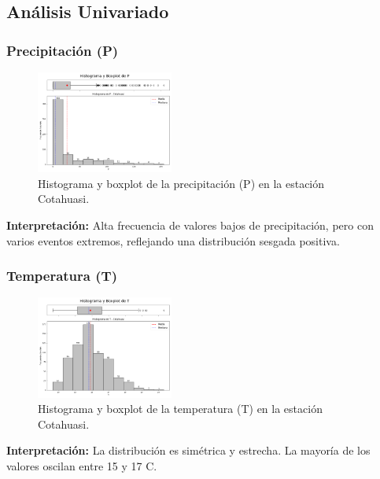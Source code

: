 \subsection{Análisis Univariado}

\subsubsection*{Precipitación (P)}
\begin{figure}[H]
\centering
\includegraphics[width=0.4\textwidth]{resultados/por_estacion_meteorologica/Cotahuasi/P_histograma.png}
\caption{Histograma y boxplot de la precipitación (P) en la estación Cotahuasi.}
\label{fig:cotahuasi_P}
\end{figure}
\textbf{Interpretación:} Alta frecuencia de valores bajos de precipitación, pero con varios eventos extremos, reflejando una distribución sesgada positiva.

\subsubsection*{Temperatura (T)}
\begin{figure}[H]
\centering
\includegraphics[width=0.4\textwidth]{resultados/por_estacion_meteorologica/Cotahuasi/T_histograma.png}
\caption{Histograma y boxplot de la temperatura (T) en la estación Cotahuasi.}
\label{fig:cotahuasi_T}
\end{figure}
\textbf{Interpretación:} La distribución es simétrica y estrecha. La mayoría de los valores oscilan entre 15 y 17 \textdegree C.

